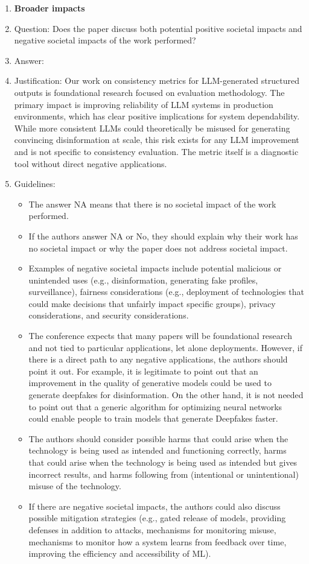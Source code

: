 \documentclass{article}
\begin{document}
\begin{enumerate}
\item {\bf Broader impacts}
    \item[] Question: Does the paper discuss both potential positive societal impacts and negative societal impacts of the work performed?
    \item[] Answer: \answerNo{} %
    \item[] Justification: \justification Our work on consistency metrics for LLM-generated structured outputs is foundational research focused on evaluation methodology. The primary impact is improving reliability of LLM systems in production environments, which has clear positive implications for system dependability. While more consistent LLMs could theoretically be misused for generating convincing disinformation at scale, this risk exists for any LLM improvement and is not specific to consistency evaluation. The metric itself is a diagnostic tool without direct negative applications.{}
    \item[] Guidelines:
    \begin{itemize}
        \item The answer NA means that there is no societal impact of the work performed.
        \item If the authors answer NA or No, they should explain why their work has no societal impact or why the paper does not address societal impact.
        \item Examples of negative societal impacts include potential malicious or unintended uses (e.g., disinformation, generating fake profiles, surveillance), fairness considerations (e.g., deployment of technologies that could make decisions that unfairly impact specific groups), privacy considerations, and security considerations.
        \item The conference expects that many papers will be foundational research and not tied to particular applications, let alone deployments. However, if there is a direct path to any negative applications, the authors should point it out. For example, it is legitimate to point out that an improvement in the quality of generative models could be used to generate deepfakes for disinformation. On the other hand, it is not needed to point out that a generic algorithm for optimizing neural networks could enable people to train models that generate Deepfakes faster.
        \item The authors should consider possible harms that could arise when the technology is being used as intended and functioning correctly, harms that could arise when the technology is being used as intended but gives incorrect results, and harms following from (intentional or unintentional) misuse of the technology.
        \item If there are negative societal impacts, the authors could also discuss possible mitigation strategies (e.g., gated release of models, providing defenses in addition to attacks, mechanisms for monitoring misuse, mechanisms to monitor how a system learns from feedback over time, improving the efficiency and accessibility of ML).
    \end{itemize}
    

\end{enumerate}
\end{document}
